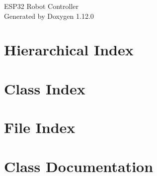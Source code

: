 \documentclass[twoside]{book}
\newcommand{\+}{\discretionary{\mbox{\scriptsize$\hookleftarrow$}}{}{}}
\newcommand{\clearemptydoublepage}{%
    \newpage{\pagestyle{empty}\cleardoublepage}%
  }
\begin{document}
  \raggedbottom
    \hypersetup{pageanchor=false,
                bookmarksnumbered=true,
                pdfencoding=unicode
               }
  \begin{titlepage}
  \vspace*{7cm}
  \begin{center}%
  {\Large ESP32 Robot Controller}\\
  \vspace*{1cm}
  {\large Generated by Doxygen 1.12.0}\\
  \end{center}
  \end{titlepage}
  \clearemptydoublepage
  \tableofcontents
  \clearemptydoublepage
  \hypersetup{pageanchor=true}
\chapter{Hierarchical Index}

\chapter{Class Index}

\chapter{File Index}

\chapter{Class Documentation}
















\end{document}
